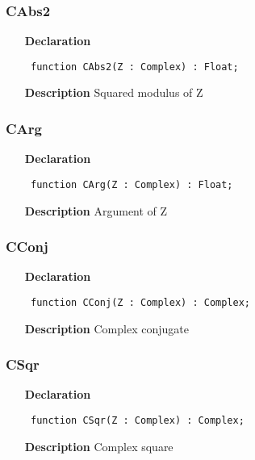 \documentclass[12pt,a4paper,oneside]{report}
\newcommand{\declarationitem}[1]{\textbf{#1}}
\newcommand{\descriptiontitle}[1]{\textbf{#1}}
\newcommand{\code}[1]{\texttt{#1}}
\begin{document}
\subsubsection{CAbs2}
\label{ucomplex-CAbs2}
\begin{itemize}\item[\declarationitem{Declaration}\hfill]
\begin{flushleft}
\code{
function CAbs2(Z : Complex) : Float;}

\end{flushleft}

\par
\item[\descriptiontitle{Description}]
Squared modulus of Z

\end{itemize}
\subsubsection{CArg}
\label{ucomplex-CArg}
\begin{itemize}\item[\declarationitem{Declaration}\hfill]
\begin{flushleft}
\code{
function CArg(Z : Complex) : Float;}

\end{flushleft}

\par
\item[\descriptiontitle{Description}]
Argument of Z

\end{itemize}
\subsubsection{CConj}
\label{ucomplex-CConj}
\begin{itemize}\item[\declarationitem{Declaration}\hfill]
\begin{flushleft}
\code{
function CConj(Z : Complex) : Complex;}

\end{flushleft}

\par
\item[\descriptiontitle{Description}]
Complex conjugate

\end{itemize}
\subsubsection{CSqr}
\label{ucomplex-CSqr}
\begin{itemize}\item[\declarationitem{Declaration}\hfill]
\begin{flushleft}
\code{
function CSqr(Z : Complex) : Complex;}

\end{flushleft}

\par
\item[\descriptiontitle{Description}]
Complex square

\end{itemize}
\end{document}
